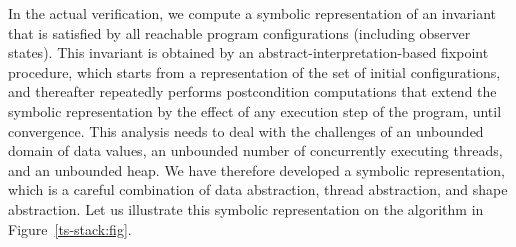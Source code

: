 In the actual verification, we compute a symbolic representation
of an invariant that is satisfied by all reachable program configurations (including observer states).
This invariant is obtained by an abstract-interpretation-based
fixpoint procedure, which starts
from a representation of the set of initial configurations, and
thereafter repeatedly performs
postcondition computations that extend the
symbolic representation by the effect of any execution step of the program,
until convergence.
This analysis needs to deal with the challenges of an unbounded domain of
data values, an unbounded number of concurrently executing threads, and an
unbounded heap. We have therefore developed a symbolic representation, which
is a careful combination of
data abstraction, thread abstraction, and shape abstraction. 
Let us illustrate this symbolic representation on the algorithm in
Figure~\ref{ts-stack:fig}.

